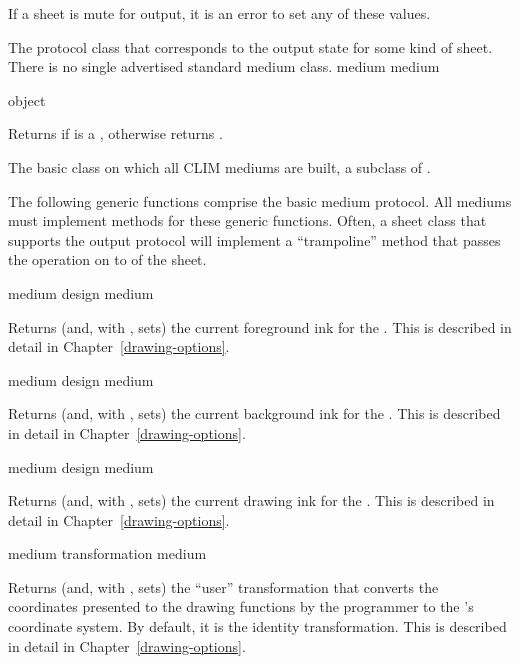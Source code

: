 If a sheet is mute for output, it is an error to set any of these values.


The protocol class that corresponds to the output state for some kind of sheet.
There is no single advertised standard medium class.
 {medium} {medium}

 {object}

Returns  if  is a , otherwise returns
.


The basic class on which all CLIM mediums are built, a subclass of .
\AbstractClass


The following generic functions comprise the basic medium protocol.  All mediums
must implement methods for these generic functions.  Often, a sheet class that
supports the output protocol will implement a ``trampoline'' method that passes
the operation on to  of the sheet.

 {medium}
 {design medium}

Returns (and, with , sets) the current foreground ink for the
 . This is described in detail in
Chapter~\ref{drawing-options}.

 {medium}
 {design medium}

Returns (and, with , sets) the current background ink for the
 .  This is described in detail in
Chapter~\ref{drawing-options}.


 {medium}
 {design medium}

Returns (and, with , sets) the current drawing ink for the
 .  This is described in detail in
Chapter~\ref{drawing-options}.


 {medium}
 {transformation medium}

Returns (and, with , sets) the ``user'' transformation that converts
the coordinates presented to the drawing functions by the programmer to the
 's coordinate system. By default, it is the identity
transformation.  This is described in detail in Chapter~\ref{drawing-options}.


